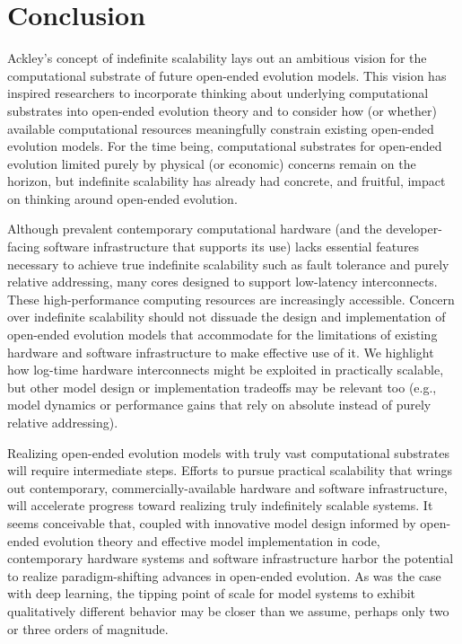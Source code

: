 \section{Conclusion}

Ackley's concept of indefinite scalability lays out an ambitious vision for the computational substrate of future open-ended evolution models.
This vision has inspired researchers to incorporate thinking about underlying computational substrates into open-ended evolution theory and to consider how (or whether) available computational resources meaningfully constrain existing open-ended evolution models.
For the time being, computational substrates for open-ended evolution limited purely by physical (or economic) concerns remain on the horizon, but indefinite scalability has already had concrete, and fruitful, impact on thinking around open-ended evolution.

Although prevalent contemporary computational hardware (and the developer-facing software infrastructure that supports its use) lacks essential features necessary to achieve true indefinite scalability such as fault tolerance and purely relative addressing, many cores designed to support low-latency interconnects.
These high-performance computing resources are increasingly accessible.
Concern over indefinite scalability should not dissuade the design and implementation of open-ended evolution models that accommodate for the limitations of existing hardware and software infrastructure to make effective use of it.
We highlight how log-time hardware interconnects might be exploited in practically scalable, but other model design or implementation tradeoffs may be relevant too (e.g., model dynamics or performance gains that rely on absolute instead of purely relative addressing).

Realizing open-ended evolution models with truly vast computational substrates will require intermediate steps.
Efforts to pursue practical scalability that wrings out contemporary, commercially-available hardware and software infrastructure, will accelerate progress toward realizing truly indefinitely scalable systems.
It seems conceivable that, coupled with innovative model design informed by open-ended evolution theory and effective model implementation in code, contemporary hardware systems and software infrastructure harbor the potential to realize paradigm-shifting advances in open-ended evolution.
As was the case with deep learning, the tipping point of scale for model systems to exhibit qualitatively different behavior may be closer than we assume, perhaps only two or three orders of magnitude.

